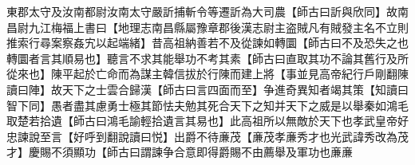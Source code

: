 東郡太守及汝南都尉汝南太守嚴訢捕斬令等遷訢為大司農【師古曰訢與欣同】故南昌尉九江梅福上書曰【地理志南昌縣屬豫章郡後漢志尉主盗賊凡有賊發主名不立則推索行尋案察姦宄以起端緒】昔高祖納善若不及從諫如轉圜【師古曰不及恐失之也轉圜者言其順易也】聽言不求其能舉功不考其素【師古曰直取其功不論其舊行及所從來也】陳平起於亡命而為謀主韓信拔於行陳而建上將【事並見高帝紀行戶剛翻陳讀曰陣】故天下之士雲合歸漢【師古曰言四面而至】争進奇異知者竭其策【知讀曰智下同】愚者盡其慮勇士極其節怯夫勉其死合天下之知并天下之威是以舉秦如鴻毛取楚若拾遺【師古曰鴻毛諭輕拾遺言其易也】此高祖所以無敵於天下也孝武皇帝好忠諫說至言【好呼到翻說讀曰悦】出爵不待亷茂【亷茂孝亷秀才也光武諱秀改為茂才】慶賜不須顯功【師古曰謂諫争合意即得爵賜不由薦舉及軍功也亷亷